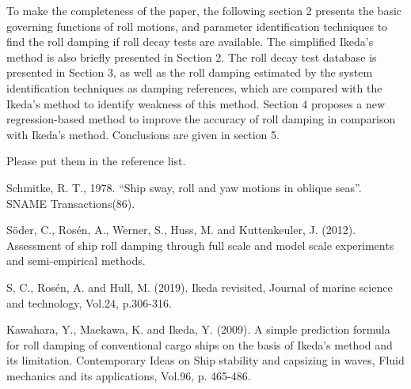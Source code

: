 To make the completeness of the paper, the following section 2 presents the basic governing functions of roll motions, and parameter identification techniques to find the roll damping if roll decay tests are available. The simplified Ikeda's method is also briefly presented in Section 2. The roll decay test database is presented in Section 3, as well as the roll damping estimated by the system identification techniques as damping references, which are compared with the Ikeda's method to identify weakness of this method. Section 4 proposes a new regression-based method to improve the accuracy of roll damping in comparison with Ikeda's method. Conclusions are given in section 5.  
\\




{\color{blue}
Please put them in the reference list.

Schmitke, R. T., 1978. “Ship sway, roll and yaw motions in oblique seas”.
SNAME Transactions(86).


S\"oder, C., Rosén, A., Werner, S., Huss, M. and Kuttenkeuler, J. (2012). Assessment of ship roll damping through full scale and model scale experiments and semi-empirical methods.

S, C., Rosén, A. and Hull, M. (2019). Ikeda revisited, Journal of marine science and technology, Vol.24, p.306-316. 

Kawahara, Y., Maekawa, K. and Ikeda, Y. (2009). A simple prediction formula for roll damping of conventional cargo ships on the basis of Ikeda's method and its limitation. Contemporary Ideas on Ship stability and capsizing in waves, Fluid mechanics and its applications, Vol.96, p. 465-486.

}
